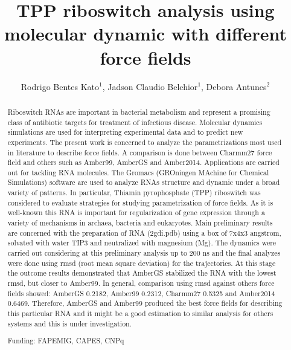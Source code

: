 \documentclass[twoside]{article}
\title{\vspace{-15mm}\fontsize{24pt}{10pt}\selectfont\textbf{TPP riboswitch analysis using molecular dynamic with different force fields}} %
\author{Rodrigo Bentes Kato$^1$, Jadson Claudio Belchior$^1$, Debora Antunes$^2$}
\affil{1 UFMG\\ 2 INSTITUI\c{C}\~AO: INSTITUTO OSWALDO CRUZ - FIOCRUZ\\ }
\date{}
\begin{document}
\maketitle %

\thispagestyle{fancy} %


\begin{abstract}
Riboswitch RNAs are important in bacterial metabolism and represent a promising class of antibiotic targets for treatment of infectious disease. Molecular dynamics simulations are used for interpreting experimental data and to predict new experiments. The present work is concerned to analyze the parametrizations most used in literature to describe force fields. A comparison is done between Charmm27 force field and others such as Amber99, AmberGS and Amber2014. Applications are carried out for tackling RNA molecules. The Gromacs (GROningen MAchine for Chemical Simulations) software are used to analyze RNAs structure and dynamic under a broad variety of patterns. In particular, Thiamin pyrophosphate (TPP) riboswitch was considered to evaluate strategies for studying parametrization of force fields. As it is well-known this RNA is important for regularization of gene expression through a variety of mechanisms in archaea, bacteria and eukaryotes. Main preliminary results are concerned with the preparation of RNA (2gdi.pdb) using a box of 7x4x3 angstrom, solvated with water TIP3 and neutralized with magnesium (Mg). The dynamics were carried out considering at this preliminary analysis up to 200 ns and the final analyzes were done using rmsd (root mean square deviation) for the trajectories. At this stage the outcome results demonstrated that AmberGS stabilized the RNA with the lowest rmsd, but closer to Amber99. In general, comparison using rmsd against others force fields showed: AmberGS 0.2182, Amber99 0.2312, Charmm27 0.5325 and Amber2014 0.6469. Therefore, AmberGS and Amber99 produced the best force fields for describing this particular RNA and it might be a good estimation to similar analysis for others systems and this is under investigation.

Funding: FAPEMIG, CAPES, CNPq
\end{abstract}
\end{document}
